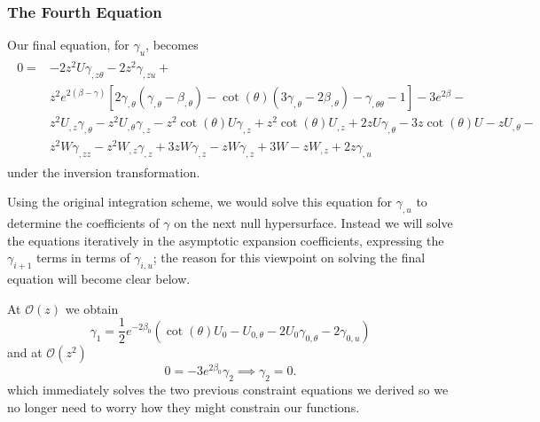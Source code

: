 \documentclass[a4paper,11pt]{article}
\numberwithin{equation}{section}
\begin{document}
\subsubsection{The Fourth Equation}
\noindent Our final equation, for $\gamma_u$, becomes 
\begin{align}
\begin{split}
0=&-2 z^2 U \gamma_{,z \theta}-2 z^2 \gamma_{,zu} + \\
& z^2  e^{ 2 (\beta  -\gamma  )} [2  \gamma_{, \theta}   (\gamma_{,\theta} - \beta_{, \theta}  )-\cot (\theta ) (3 \gamma_{, \theta}-2 \beta_{,\theta} )-\gamma_{, \theta \theta}-1]-3  e^{ 2 \beta  }-\\
&z^2 U_{,z} \gamma_{,\theta}-z^2 U_{, \theta} \gamma_{,z} -z^2 \cot (\theta ) U \gamma_{,z}+z^2 \cot (\theta ) U_{,z} +2 z U \gamma_{, \theta} -3 z \cot (\theta ) U -z U_{,\theta}-\\
&z^2 W \gamma_{,zz}-z^2 W_{,z} \gamma_{,z} +3 z W \gamma_{,z} - z W  \gamma_{,z}+3 W -z W_{,z}+2 z\gamma_{,u} 
\end{split}
\end{align}
under the inversion transformation.

Using the original integration scheme, we would solve this equation for $\gamma_{,u}$ to determine the coefficients of $\gamma$ on the next null hypersurface. Instead we will solve the equations iteratively in the asymptotic expansion coefficients, expressing the $\gamma_{i+1}$ terms in terms of $\gamma_{i,u}$; the reason for this viewpoint on solving the final equation will become clear below. 

At $\mathcal{O}(z)$ we obtain
\begin{equation} \label{eq: gamma_1}
\gamma_1=\frac{1}{2}e^{-2\beta_0}(\cot(\theta)U_0-U_{0,\theta}-2U_0\gamma_{0,\theta}-2\gamma_{0,u})
\end{equation}
and at $\mathcal{O}(z^2)$
\begin{equation}
0=-3e^{2\beta_0}\gamma_2 \implies \gamma_2=0.
\end{equation}
which immediately solves the two previous constraint equations we derived so we no longer need to worry how they might constrain our functions. \par
\end{document}

